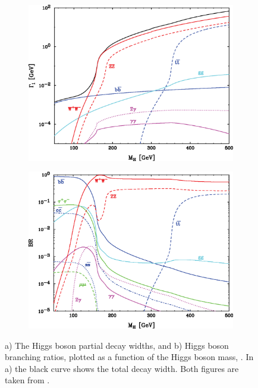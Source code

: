 \begin{figure}[tbph]
\centering
    \begin{subfigure}[b]{0.45\textwidth}
        \includegraphics[width=\textwidth]{theory/HiggsDecayWidth}
        \caption{}
        \label{fig:theoryHiggsDecayWidth}
    \end{subfigure}
    \begin{subfigure}[b]{0.45\textwidth}
        \includegraphics[width=\textwidth]{theory/HiggsBranchingRatio}
        \caption{}
        \label{fig:theoryHiggsBranchingRatio}
    \end{subfigure}
\caption[SM Higgs boson decay width and branching ratios]%
{a) The Higgs boson partial decay widths, and b) Higgs boson branching ratios, plotted as a function of the Higgs boson mass, \Hmass. In a) the black curve shows the total decay width. Both figures are taken from \cite{Rainwater:2007cp}.}
\label{fig:theoryHiggsPhenomenology}
\end{figure}


